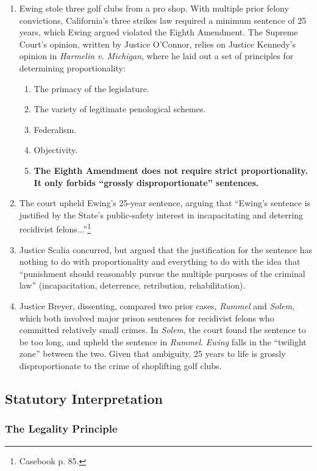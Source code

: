 \begin{enumerate}
    \item Ewing stole three golf clubs from a pro shop. With multiple prior felony convictions, California's three strikes law required a minimum sentence of 25 years, which Ewing argued violated the Eighth Amendment.
    The Supreme Court's opinion, written by Justice O'Connor, relies on Justice Kennedy's opinion in \emph{Harmelin v. Michigan}, where he laid out a set of principles for determining proportionality:
    \begin{enumerate}
        \item The primacy of the legislature.
        \item The variety of legitimate penological schemes.
        \item Federalism.
        \item Objectivity.
        \item \textbf{The Eighth Amendment does not require strict proportionality. It only forbids ``grossly disproportionate'' sentences.}
    \end{enumerate}
    \item The court upheld Ewing's 25-year sentence, arguing that ``Ewing's sentence is justified by the State's public-safety interest in incapacitating and deterring recidivist felons...''\footnote{Casebook p. 85.}
    \item Justice Scalia concurred, but argued that the justification for the sentence has nothing to do with proportionality and everything to do with the idea that ``punishment should reasonably pursue the multiple purposes of the criminal law'' (incapacitation, deterrence, retribution, rehabilitation).
    \item Justice Breyer, dissenting, compared two prior cases, \emph{Rummel} and \emph{Solem}, which both involved major prison sentences for recidivist felons who committed relatively small crimes. In \emph{Solem}, the court found the sentence to be too long, and upheld the sentence in \emph{Rummel}. \emph{Ewing} falls in the ``twilight zone'' between the two. Given that ambiguity, 25 years to life is grossly disproportionate to the crime of shoplifting golf clubs.
\end{enumerate}

\subsection{Statutory Interpretation}

\subsubsection{The Legality Principle}

